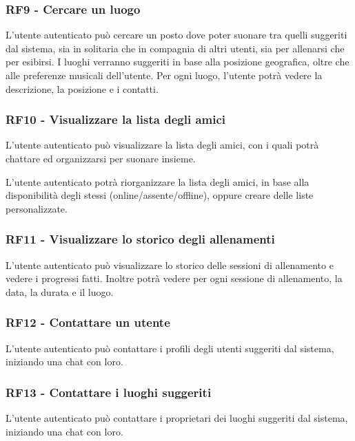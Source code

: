 \documentclass[12pt, a4paper]{article}
\begin{document}
\subsubsection*{\hypertarget{RF9}{RF9 - Cercare un luogo}}


L'utente autenticato può cercare un posto dove poter suonare tra quelli suggeriti dal sistema, sia in solitaria che in compagnia di altri utenti, sia per allenarsi che per esibirsi. I luoghi verranno suggeriti in base alla posizione geografica, oltre che alle preferenze musicali dell'utente. Per ogni luogo, l'utente potrà vedere la descrizione, la posizione e i contatti.

\subsubsection*{\hypertarget{RF10}{RF10 - Visualizzare la lista degli amici}}

L'utente autenticato può visualizzare la lista degli amici, con i quali potrà chattare ed organizzarsi per suonare insieme.


L'utente autenticato potrà riorganizzare la lista degli amici, in base alla disponibilità degli stessi (online/assente/offline), oppure creare delle liste personalizzate.


\subsubsection*{\hypertarget{RF11}{RF11 - Visualizzare lo storico degli allenamenti}}

L'utente autenticato può visualizzare lo storico delle sessioni di allenamento e vedere i progressi fatti. Inoltre potrà vedere per ogni sessione di allenamento, la data, la durata e il luogo.

\subsubsection*{\hypertarget{RF12}{RF12 - Contattare un utente}}

L'utente autenticato può contattare i profili degli utenti suggeriti dal sistema, iniziando una chat con loro.

\subsubsection*{\hypertarget{RF13}{RF13 - Contattare i luoghi suggeriti}}

L'utente autenticato può contattare i proprietari dei luoghi suggeriti dal sistema, iniziando una chat con loro.
\end{document}
